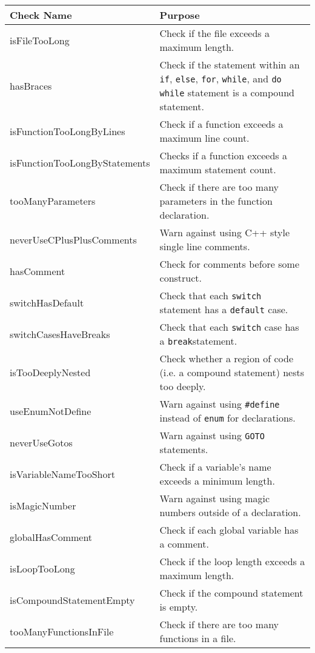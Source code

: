 \documentclass[12pt]{report}
\begin{document}
\begin{table}
\small
	\begin{center}
	\begin{tabular}{p{5.4cm} p{8.8cm}}
		\toprule
		Check Name & Purpose \\
		\midrule
		isFileTooLong & Check if the file exceeds a maximum length. \\
		hasBraces & Check if the statement within an \lstinline!if!, \lstinline!else!, \lstinline!for!, \lstinline!while!, and \lstinline!do while! statement is a compound statement.\\
		isFunctionTooLongByLines & Check if a function exceeds a maximum line count. \\
		isFunctionTooLongByStatements & Checks if a function exceeds a maximum statement count. \\
		tooManyParameters & Check if there are too many parameters in the function declaration. \\
		neverUseCPlusPlusComments & Warn against using C++ style single line comments. \\
		hasComment & Check for comments before some construct. \\
		switchHasDefault & Check that each \lstinline!switch! statement has a \lstinline!default! case. \\
		switchCasesHaveBreaks & Check that each \lstinline!switch! case has a \lstinline!break!statement. \\
		isTooDeeplyNested & Check whether a region of code (i.e. a compound statement) nests too deeply. \\
		useEnumNotDefine & Warn against using \lstinline!#define! instead of \lstinline!enum! for declarations. \\
		neverUseGotos & Warn against using \lstinline!GOTO! statements. \\
		isVariableNameTooShort & Check if a variable's name exceeds a minimum length. \\
		isMagicNumber & Warn against using magic numbers outside of a declaration. \\
		globalHasComment & Check if each global variable has a comment. \\
		isLoopTooLong & Check if the loop length exceeds a maximum length. \\
		isCompoundStatementEmpty  & Check if the compound statement is empty. \\
		tooManyFunctionsInFile & Check if there are too many functions in a file. \\

\end{tabular}
\end{center}
\end{table}
\end{document}
